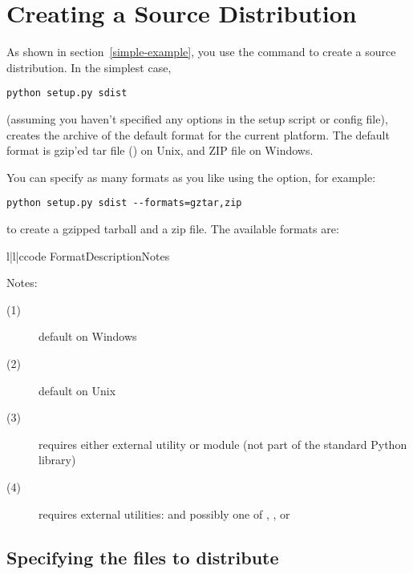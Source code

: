 \documentclass{howto}
\begin{document}
\section{Creating a Source Distribution}
\label{source-dist}

As shown in section~\ref{simple-example}, you use the
 command to create a source distribution.  In the
simplest case,
\begin{verbatim}
python setup.py sdist
\end{verbatim}
(assuming you haven't specified any  options in the setup
script or config file),  creates the archive of the
default format for the current platform.  The default format is gzip'ed
tar file () on Unix, and ZIP file on Windows. 

You can specify as many formats as you like using the
 option, for example:
\begin{verbatim}
python setup.py sdist --formats=gztar,zip
\end{verbatim}
to create a gzipped tarball and a zip file.  The available formats are:
\begin{tableiii}{l|l|c}{code}%
  {Format}{Description}{Notes}
\end{tableiii}

\noindent Notes:
\begin{description}
\item[(1)] default on Windows
\item[(2)] default on Unix
\item[(3)] requires either external  utility or
   module (not part of the standard Python library)
\item[(4)] requires external utilities:  and possibly one
  of , , or 
\end{description}



\subsection{Specifying the files to distribute}
\label{manifest}
\end{document}
